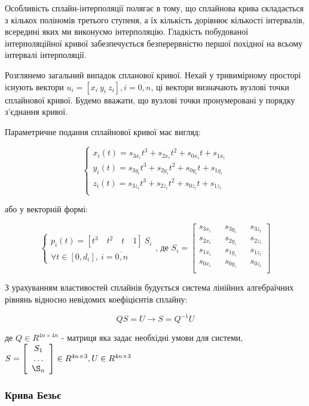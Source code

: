 \let\mypdfximage\pdfximage\def\pdfximage{\immediate\mypdfximage}\documentclass[14pt,a4paper]{extarticle}
\theoremstyle{definition}
\renewcommand{\[}{\begin{singlespace}\begin{equation*}}
\renewcommand{\]}{\end{equation*}\end{singlespace}}
\renewcommand{\+}{\discretionary{\mbox{\scriptsize$\hookleftarrow$}}{}{}}
\begin{document}
Особливість сплайн-інтерполяції полягає в тому, що сплайнова крива складається з кількох поліномів третього ступеня, а їх кількість дорівнює кількості інтервалів, всередині яких ми виконуємо інтерполяцію. Гладкість побудованої інтерполяційної кривої забезпечується безперервністю першої похідної на всьому інтервалі інтерполяції.

Розглянемо загальний випадок спланової кривої. Нехай у тривимірному просторі існують вектори $u_i = [x_i\ y_i\ z_i], i=\overline{0,n}$, ці вектори визначають вузлові точки сплайнової кривої. Будемо вважати, що вузлові точки пронумеровані у порядку з’єднання кривої.


Параметричне подання сплайнової кривої має вигляд:
\[\left\{\begin{array}{l}
x_i(t)=s_{3x_i}t^3+s_{2x_i}t^2+s_{0x_i}t+s_{1x_i}\\
y_i(t)=s_{3y_i}t^3+s_{2y_i}t^2+s_{0y_i}t+s_{1y_i}\\
z_i(t)=s_{3z_i}t^3+s_{2z_i}t^2+s_{0z_i}t+s_{1z_i}\\
\end{array}\right.\]
або у  векторній формі:
\[\left\{\begin{array}{l}
p_i(t)=[t^3\quad t^2\quad t\quad 1]\ S_i\\
\forall t \in [0, d_i],\ i = \overline{0,n}
\end{array}\right.\text{, де }S_i=\left[\begin{matrix}
s_{3x_i} && s_{3y_i} && s_{3z_i} \\
s_{2x_i} && s_{2y_i} && s_{2z_i} \\
s_{1x_i} && s_{1y_i} && s_{1z_i} \\
s_{0x_i} && s_{0y_i} && s_{0z_i} \\
\end{matrix}\right]\]

З урахуванням властивостей сплайнів будується система лінійних алгебраїчних рівнянь відносно невідомих коефіцієнтів сплайну:
\[QS=U \to S=Q^{-1}U\]
де $Q\in R^{4n\times4n}$ - матриця яка задає необхідні умови для системи, 
$S=\left[\begin{array}{c}S_1\\\dots\\\S_n\end{array}\right]\in R^{4n\times3}, U \in R^{4n\times3}$

\subsubsection{Крива Безьє}
\end{document}

